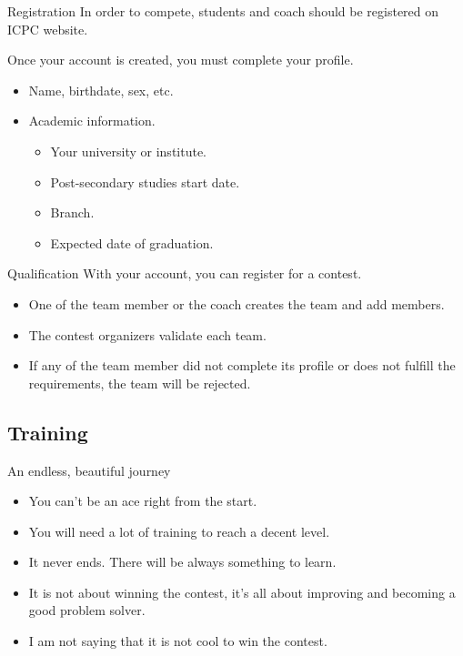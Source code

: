 \documentclass{beamer}
\begin{document}
\begin{frame}{Registration}
In order to compete, students and coach should be registered on ICPC website.

Once your account is created, you must complete your profile.
\begin{itemize}
  \justifying
  \item Name, birthdate, sex, etc.
  \item Academic information.
    \begin{itemize}
      \justifying
      \item Your university or institute.
      \item Post-secondary studies start date.
      \item Branch.
      \item Expected date of graduation.
    \end{itemize}
\end{itemize}
\end{frame}

\begin{frame}{Qualification}
With your account, you can register for a contest.

\begin{itemize}
  \justifying
  \item One of the team member or the coach creates the team and add members.
  \item The contest organizers validate each team. 
  \item If any of the team member did not complete its profile or does not fulfill the requirements, the team will be rejected.
\end{itemize}
\end{frame}

\subsection{Training}

\begin{frame}{An endless, beautiful journey}
\begin{itemize}
  \justifying
  \item You can't be an ace right from the start.
  \item You will need a lot of training to reach a decent level.
  \item It never ends. There will be always something to learn.
  \item It is not about winning the contest, it's all about improving and becoming a good problem solver.
  \item I am not saying that it is not cool to win the contest.
\end{itemize}
\end{frame}
\end{document}
